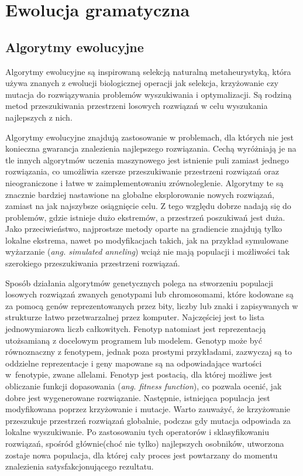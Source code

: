 
\section{Ewolucja gramatyczna}
\label{sec:ewolucjaGramatyczna}
\subsection{Algorytmy ewolucyjne}
Algorytmy ewolucyjne \cite{EA} są inspirowaną selekcją naturalną metaheurystyką, która używa znanych z ewolucji biologicznej operacji jak selekcja, krzyżowanie czy mutacja do rozwiązywania problemów wyszukiwania i optymalizacji. Są rodziną metod przeszukiwania przestrzeni losowych rozwiązań w celu wyszukania najlepszych z nich. 

Algorytmy ewolucyjne znajdują zastosowanie w problemach, dla których nie jest konieczna gwarancja znalezienia najlepszego rozwiązania. Cechą wyróżniają je na tle innych algorytmów uczenia maszynowego jest istnienie puli zamiast jednego rozwiązania, co umożliwia szersze przeszukiwanie przestrzeni rozwiązań oraz nieograniczone i łatwe w zaimplementowaniu zrównoleglenie. Algorytmy te są znacznie bardziej nastawione na globalne eksplorowanie nowych rozwiązań, zamiast na jak najszybsze osiągnięcie celu. Z tego względu dobrze nadają się do problemów, gdzie istnieje dużo ekstremów, a przestrzeń poszukiwań jest duża. Jako przeciwieństwo, najprostsze metody oparte na gradiencie znajdują tylko lokalne ekstrema, nawet po modyfikacjach takich, jak na przykład symulowane wyżarzanie (\textit{ang. simulated anneling}) wciąż nie mają populacji i możliwości tak szerokiego przeszukiwania przestrzeni rozwiązań.

Sposób działania algorytmów genetycznych polega na stworzeniu populacji losowych rozwiązań zwanych genotypami lub chromosomami, które kodowane są za pomocą genów reprezentowanych przez bity, liczby lub znaki i zapisywanych w strukturze łatwo przetwarzalnej przez komputer. Najczęściej jest to lista jednowymiarowa liczb całkowitych. Fenotyp natomiast jest reprezentacją utożsamianą z docelowym programem lub modelem. Genotyp może być równoznaczny z fenotypem, jednak poza prostymi przykładami, zazwyczaj są to oddzielne reprezentacje i geny mapowane są na odpowiadające wartości w~fenotypie, zwane allelami. Fenotyp jest postacią, dla której możliwe jest obliczanie funkcji dopasowania (\textit{ang. fitness function}), co pozwala ocenić, jak dobre jest wygenerowane rozwiązanie. Następnie, istniejąca populacja jest modyfikowana poprzez krzyżowanie i mutacje. Warto zauważyć, że krzyżowanie przeszukuje przestrzeń rozwiązań globalnie, podczas gdy mutacja odpowiada za lokalne wyszukiwanie. Po zastosowaniu tych operatorów i sklasyfikowaniu rozwiązań, spośród głównie(choć nie tylko) najlepszych osobników, utworzona zostaje nowa populacja, dla której cały proces jest powtarzany do momentu znalezienia satysfakcjonującego rezultatu.


